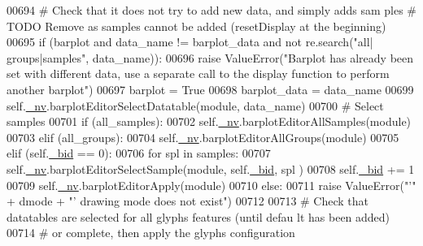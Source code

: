 \begin{DoxyCode}
00694                 \textcolor{comment}{# Check that it does not try to add new data, and simply adds sam
      ples # TODO Remove as samples cannot be added (resetDisplay at the beginning)}
00695                 \textcolor{keywordflow}{if} (barplot \textcolor{keywordflow}{and} data\_name != barplot\_data \textcolor{keywordflow}{and} \textcolor{keywordflow}{not} re.search(\textcolor{stringliteral}{"all|
      groups|samples"}, data\_name)):
00696                     \textcolor{keywordflow}{raise} ValueError(\textcolor{stringliteral}{"Barplot has already been set with different
       data, use a separate call to the display function to perform another barplot"})
00697                 barplot = \textcolor{keyword}{True}
00698                 barplot\_data = data\_name
00699                 self.\hyperlink{classnavicom_1_1navicom_1_1NaviCom_afff3fd56fa16a68bab52ba8d801e325a}{_nv}.barplotEditorSelectDatatable(module, data\_name)
00700                 \textcolor{comment}{# Select samples}
00701                 \textcolor{keywordflow}{if} (all\_samples):
00702                     self.\hyperlink{classnavicom_1_1navicom_1_1NaviCom_afff3fd56fa16a68bab52ba8d801e325a}{_nv}.barplotEditorAllSamples(module)
00703                 \textcolor{keywordflow}{elif} (all\_groups):
00704                     self.\hyperlink{classnavicom_1_1navicom_1_1NaviCom_afff3fd56fa16a68bab52ba8d801e325a}{_nv}.barplotEditorAllGroups(module)
00705                 \textcolor{keywordflow}{elif} (self.\hyperlink{classnavicom_1_1navicom_1_1NaviCom_a496d13fc4c8b73cef4f496b713d12b79}{_bid} == 0):
00706                     \textcolor{keywordflow}{for} spl \textcolor{keywordflow}{in} samples:
00707                         self.\hyperlink{classnavicom_1_1navicom_1_1NaviCom_afff3fd56fa16a68bab52ba8d801e325a}{_nv}.barplotEditorSelectSample(module, self.\hyperlink{classnavicom_1_1navicom_1_1NaviCom_a496d13fc4c8b73cef4f496b713d12b79}{_bid}, spl
      )
00708                         self.\hyperlink{classnavicom_1_1navicom_1_1NaviCom_a496d13fc4c8b73cef4f496b713d12b79}{_bid} += 1
00709                     self.\hyperlink{classnavicom_1_1navicom_1_1NaviCom_afff3fd56fa16a68bab52ba8d801e325a}{_nv}.barplotEditorApply(module)
00710             \textcolor{keywordflow}{else}:
00711                 \textcolor{keywordflow}{raise} ValueError(\textcolor{stringliteral}{"'"} + dmode + \textcolor{stringliteral}{"' drawing mode does not exist"})
00712 
00713         \textcolor{comment}{# Check that datatables are selected for all glyphs features (until defau
      lt has been added)}
00714         \textcolor{comment}{# or complete, then apply the glyphs configuration}

\end{DoxyCode}
